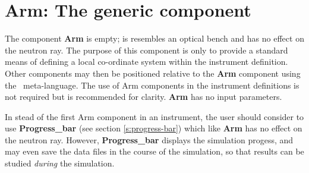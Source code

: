 \section{Arm: The generic component}
\label{explain:arm}

The component {\bf Arm} is empty; is resembles an optical bench
and has no effect on the neutron ray.
The purpose of this component is only to provide a standard
means of defining a local co-ordinate system within the instrument definition.
Other components may then be
positioned relative to the {\bf Arm} component
using the \MCS\ meta-language.
The use of {\rm Arm} components in the instrument definitions
is not required but is recommended for clarity.
{\bf Arm} has no input parameters.

In stead of the first {\rm Arm} component in an instrument,
the user should consider to use {\bf Progress\_bar} 
(see section \ref{s:progress-bar}) which like {\bf Arm} has no effect
on the neutron ray. 
However, {\bf Progress\_bar} displays the simulation progess, 
and may even save the data files in the course of the simulation, 
so that results can be studied \emph{during} the simulation.

